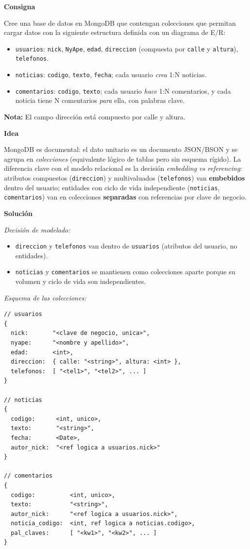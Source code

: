 \documentclass[11pt,a4paper]{article}
\newcommand{\itemcabecera}[1]{\noindent\textbf{#1}\par\medskip}
\newcommand{\bloqueConsigna}{\itemcabecera{Consigna}}
\newcommand{\bloqueIdea}{\itemcabecera{Idea}}
\newcommand{\bloqueSolucion}{\itemcabecera{Soluci\'on}}
\begin{document}
\bloqueConsigna

Cree una base de datos en MongoDB que contengan colecciones que permitan cargar datos con la siguiente estructura definida con un diagrama de E/R:

\begin{itemize}
    \item \texttt{usuarios}: \texttt{nick}, \texttt{NyApe}, \texttt{edad}, \texttt{direccion} (compuesta por \texttt{calle} y \texttt{altura}), \texttt{telefonos}.
    \item \texttt{noticias}: \texttt{codigo}, \texttt{texto}, \texttt{fecha}; cada usuario \emph{crea} 1:N noticias.
    \item \texttt{comentarios}: \texttt{codigo}, \texttt{texto}; cada usuario \emph{hace} 1:N comentarios, y cada noticia tiene N comentarios \emph{para} ella, con palabras clave.
\end{itemize}

\textbf{Nota:} El campo dirección está compuesto por calle y altura.

\bloqueIdea

MongoDB es documental: el dato unitario es un documento JSON/BSON y se agrupa en \emph{colecciones} (equivalente lógico de tablas pero sin esquema rígido). La diferencia clave con el modelo relacional es la decisión \emph{embedding vs referencing}: atributos compuestos (\texttt{direccion}) y multivaluados (\texttt{telefonos}) van \textbf{embebidos} dentro del usuario; entidades con ciclo de vida independiente (\texttt{noticias}, \texttt{comentarios}) van en colecciones \textbf{separadas} con referencias por clave de negocio.

\bloqueSolucion

\textit{Decisión de modelado:}

\begin{itemize}
    \item \texttt{direccion} y \texttt{telefonos} van dentro de \texttt{usuarios} (atributos del usuario, no entidades).
    \item \texttt{noticias} y \texttt{comentarios} se mantienen como colecciones aparte porque su volumen y ciclo de vida son independientes.
\end{itemize}

\textit{Esquema de las colecciones:}

\begin{lstlisting}[style=plain]
// usuarios
{
  nick:       "<clave de negocio, unica>",
  nyape:      "<nombre y apellido>",
  edad:       <int>,
  direccion:  { calle: "<string>", altura: <int> },
  telefonos:  [ "<tel1>", "<tel2>", ... ]
}

// noticias
{
  codigo:      <int, unico>,
  texto:       "<string>",
  fecha:       <Date>,
  autor_nick:  "<ref logica a usuarios.nick>"
}

// comentarios
{
  codigo:          <int, unico>,
  texto:           "<string>",
  autor_nick:      "<ref logica a usuarios.nick>",
  noticia_codigo:  <int, ref logica a noticias.codigo>,
  pal_claves:      [ "<kw1>", "<kw2>", ... ]
}
\end{lstlisting}
\end{document}
